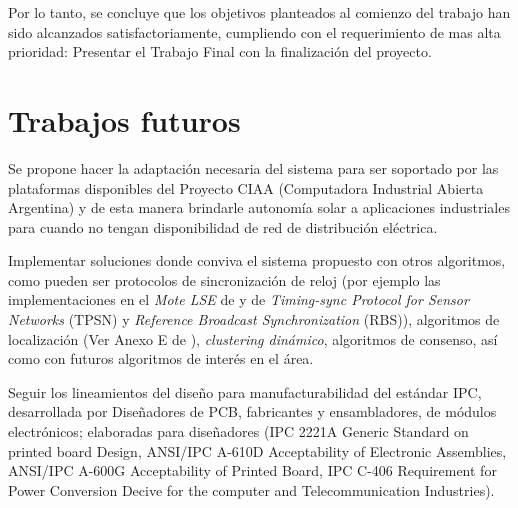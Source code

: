 \medskip

Por lo tanto, se concluye que los objetivos planteados al comienzo del trabajo han sido alcanzados satisfactoriamente, cumpliendo con el requerimiento de mas alta prioridad: Presentar el Trabajo Final con la finalización del proyecto.

\section{Trabajos futuros}

Se propone hacer la adaptación necesaria del sistema para ser soportado por las plataformas disponibles del Proyecto CIAA \citep{CIAA} (Computadora Industrial Abierta Argentina) y de esta manera brindarle autonomía solar a aplicaciones industriales para cuando no tengan disponibilidad de red de distribución eléctrica.

Implementar soluciones donde conviva el sistema propuesto con otros algoritmos, como pueden ser protocolos de sincronización de reloj (por ejemplo las implementaciones en el \textit{Mote LSE} de \citep{sync1} y \citep{sync2} de \textit{Timing-sync Protocol for Sensor Networks} (TPSN) y \textit{Reference Broadcast Synchronization} (RBS)), algoritmos de localización (Ver Anexo E de \citep{802154}), \textit{clustering dinámico}, algoritmos de consenso, así como con futuros algoritmos de interés en el área.

Seguir los lineamientos del diseño para manufacturabilidad del estándar IPC, desarrollada por Diseñadores de PCB, fabricantes y ensambladores, de módulos electrónicos; elaboradas para diseñadores (IPC 2221A Generic Standard on printed board Design, ANSI/IPC A-610D Acceptability of Electronic Assemblies, ANSI/IPC A-600G Acceptability of Printed Board, IPC C-406 Requirement for Power Conversion Decive for the computer and Telecommunication Industries).











